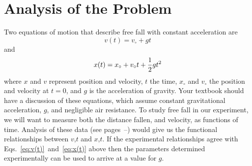 \section*{Analysis of the Problem}
Two equations of motion that describe free fall with constant
acceleration are
\begin{equation}
v(t) = v_{\circ} + gt  \label{eq:v(t)}
\end{equation}
 and
\begin{equation}
x(t) = x_{\circ} + v_{\circ}t + {{1} \over {2}} gt^{2}  \label{eq:x(t)}
\end{equation}
where $x$ and $v$ represent position and velocity, $t$ the time, $x_{\circ}$ and
$v_{\circ}$ the position and velocity at $t = 0$, and $g$ is the acceleration
of gravity.  Your textbook should have a discussion of these equations,
which assume constant gravitational
acceleration, $g$, and negligible air resistance.  To study free fall in
our experiment, we will want to measure both the distance fallen, and velocity,
 as functions
of time.  Analysis of these
data (see pages~\pageref{scierror}--\pageref{compassis}) would give us the
functional relationships
between $v$,$t$ and $x$,$t$.  If the experimental relationships agree
with Eqs.~\ref{eq:v(t)}~and~\ref{eq:x(t)} above then the parameters determined
experimentally can be used to arrive at a value for $g$.


